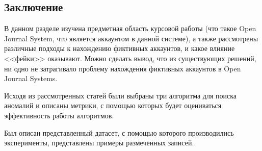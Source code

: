 \vspace{1.5em}
\subsection{Заключение}
\label{subsec:Itog}
В данном разделе изучена предметная область курсовой работы (что такое Open Journal System, что является аккаунтом в данной системе), а также рассмотрены различные подходы к нахождению фиктивных аккаунтов, и какое влияние <<фейки>> оказывают. Можно сделать вывод, что из существующих решений, ни одно не затрагивало проблему нахождения фиктивных аккаунтов в Open Journal Systems. 

Исходя из рассмотренных статей были выбраны три алгоритма для поиска аномалий и описаны метрики, с помощью которых будет оцениваться эффективность работы алгоритмов. 

Был описан представленный датасет, с помощью которого производились эксперименты, представлены примеры размеченных записей.